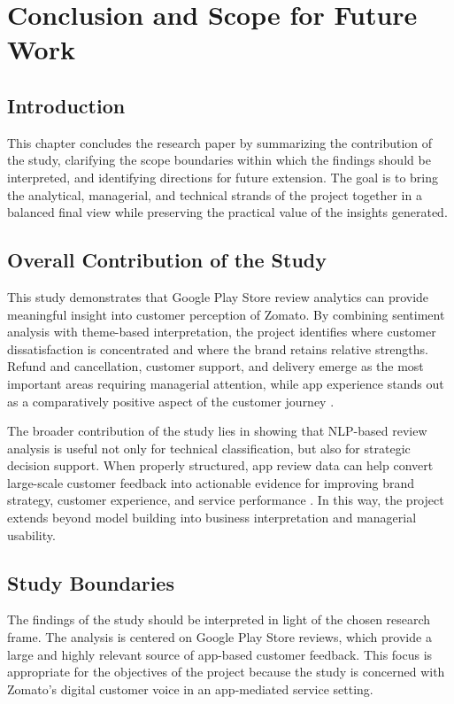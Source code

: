 \chapter{Conclusion and Scope for Future Work}

\section{Introduction}

This chapter concludes the research paper by summarizing the contribution of the study, clarifying the scope boundaries within which the findings should be interpreted, and identifying directions for future extension. The goal is to bring the analytical, managerial, and technical strands of the project together in a balanced final view while preserving the practical value of the insights generated.

\section{Overall Contribution of the Study}

This study demonstrates that Google Play Store review analytics can provide meaningful insight into customer perception of Zomato. By combining sentiment analysis with theme-based interpretation, the project identifies where customer dissatisfaction is concentrated and where the brand retains relative strengths. Refund and cancellation, customer support, and delivery emerge as the most important areas requiring managerial attention, while app experience stands out as a comparatively positive aspect of the customer journey \cite{lemon2016,keller2013}.

The broader contribution of the study lies in showing that NLP-based review analysis is useful not only for technical classification, but also for strategic decision support. When properly structured, app review data can help convert large-scale customer feedback into actionable evidence for improving brand strategy, customer experience, and service performance \cite{liu2012,verhoef2010}. In this way, the project extends beyond model building into business interpretation and managerial usability.

\section{Study Boundaries}

The findings of the study should be interpreted in light of the chosen research frame. The analysis is centered on Google Play Store reviews, which provide a large and highly relevant source of app-based customer feedback. This focus is appropriate for the objectives of the project because the study is concerned with Zomato's digital customer voice in an app-mediated service setting.

